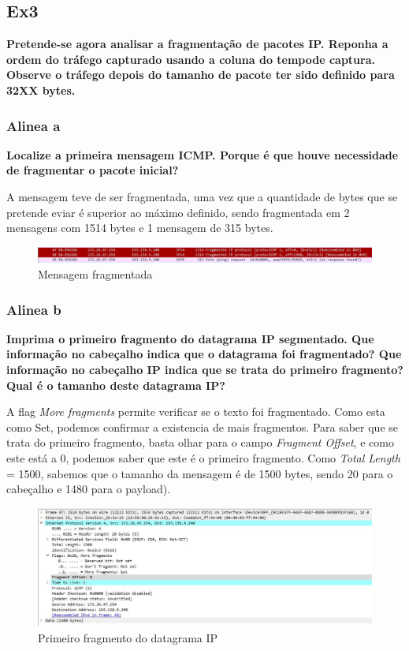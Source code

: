 \documentclass{article}
\begin{document}
\subsection{Ex3}
\textbf{Pretende-se agora analisar a fragmentação de pacotes IP. Reponha a ordem do tráfego capturado usando a coluna do tempode captura. Observe o tráfego depois do tamanho de pacote ter sido definido para 32XX bytes.}

\subsubsection{Alinea a}
\textbf{Localize a primeira mensagem ICMP. Porque é que houve necessidade de fragmentar o pacote inicial?} \\\par
A mensagem teve de ser fragmentada, uma vez que a quantidade de bytes que se pretende eviar é superior ao máximo definido, sendo fragmentada em 2 mensagens com 1514 bytes e 1 mensagem de 315 bytes.\\

\newpage

\begin{figure}[h]
	\centering
	\includegraphics[scale = 0.5]{fragmentos.JPG}
	\caption{Mensagem fragmentada}
\end{figure}

\subsubsection{Alinea b}
\textbf{Imprima o primeiro fragmento do datagrama IP segmentado. Que informação no cabeçalho indica que o datagrama foi fragmentado? Que informação no cabeçalho IP indica que se trata do primeiro fragmento? Qual é o tamanho deste datagrama IP?} \\\par
A flag \textit{More fragments} permite verificar se o texto foi fragmentado. Como esta como Set, podemos confirmar a existencia de mais fragmentos. Para saber que se trata do primeiro fragmento, basta olhar para o campo \textit{Fragment Offset}, e como este está a 0, podemos saber que este é o primeiro fragmento. Como \textit{Total Length} = 1500, sabemos que o tamanho da mensagem é de 1500 bytes, sendo 20 para o cabeçalho e 1480 para o payload).\\

\begin{figure}[h]
	\centering
	\includegraphics[scale = 0.5]{primeiro-fragmento.JPG}
	\caption{Primeiro fragmento do datagrama IP}
\end{figure}
\end{document}
